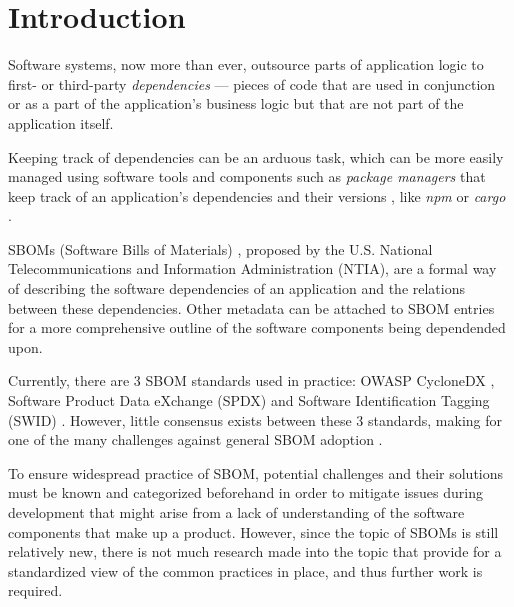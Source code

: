 \section{Introduction}

Software systems, now more than ever, outsource parts of application logic to first- or third-party \emph{dependencies} --- pieces of code that are used in conjunction or as a part of the application's business logic but that are not part of the application itself.

Keeping track of dependencies can be an arduous task, which can be more easily managed using software tools and components such as \emph{package managers} that keep track of an application's dependencies and their versions \cite{article:package-manager}, like \emph{npm} or \emph{cargo} \cite{tools:pkg-mngr:npm,tools:pkg-mngr:cargo}.

SBOMs (Software Bills of Materials) \cite{article:concept:sbom-2}, proposed by the U.S. National Telecommunications and Information Administration (NTIA), are a formal way of describing the software dependencies of an application and the relations between these dependencies. Other metadata can be attached to SBOM entries for a more comprehensive outline of the software components being dependended upon.

Currently, there are 3 SBOM standards used in practice: OWASP CycloneDX \cite{standards:sbom:cyclonedx}, Software Product Data eXchange (SPDX) \cite{standards:sbom:spdx} and Software Identification Tagging (SWID) \cite{standards:sbom:swid}. However, little consensus exists between these 3 standards, making for one of the many challenges against general SBOM adoption \cite{article:sbom-study}.

To ensure widespread practice of SBOM, potential challenges and their solutions must be known and categorized beforehand in order to mitigate issues during development that might arise from a lack of understanding of the software components that make up a product. However, since the topic of SBOMs is still relatively new, there is not much research made into the topic that provide for a standardized view of the common practices in place, and thus further work is required.

